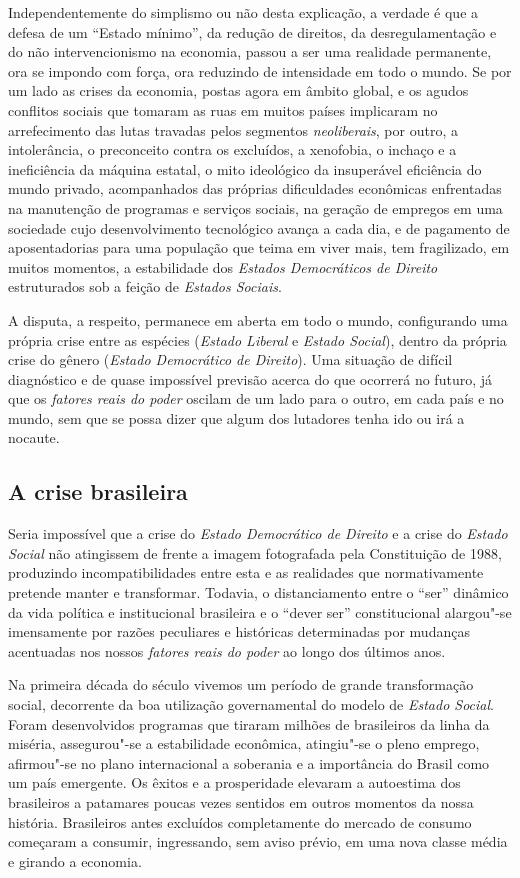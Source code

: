 Independentemente do simplismo ou não desta explicação, a verdade é que
a defesa de um ``Estado mínimo'', da redução de direitos, da
desregulamentação e do não intervencionismo na economia, passou a ser
uma realidade permanente, ora se impondo com força, ora reduzindo de
intensidade em todo o mundo. Se por um lado as crises da economia,
postas agora em âmbito global, e os agudos conflitos sociais que tomaram
as ruas em muitos países implicaram no arrefecimento das lutas travadas
pelos segmentos \emph{neoliberais}, por outro, a intolerância, o
preconceito contra os excluídos, a xenofobia, o inchaço e a ineficiência
da máquina estatal, o mito ideológico da insuperável eficiência do mundo
privado, acompanhados das próprias dificuldades econômicas enfrentadas
na manutenção de programas e serviços sociais, na geração de empregos em
uma sociedade cujo desenvolvimento tecnológico avança a cada dia, e de
pagamento de aposentadorias para uma população que teima em viver mais,
tem fragilizado, em muitos momentos, a estabilidade dos \emph{Estados
Democráticos de Direito} estruturados sob a feição de \emph{Estados
Sociais}.

A disputa, a respeito, permanece em aberta em todo o mundo, configurando
uma própria crise entre as espécies (\emph{Estado Liberal} e
\emph{Estado Social}), dentro da própria crise do gênero (\emph{Estado
Democrático de Direito}). Uma situação de difícil diagnóstico e de quase
impossível previsão acerca do que ocorrerá no futuro, já que os
\emph{fatores reais do poder} oscilam de um lado para o outro, em
cada país e no mundo, sem que se possa dizer que algum dos lutadores
tenha ido ou irá a nocaute.

\subsection{A crise brasileira}

Seria impossível que a crise do \emph{Estado Democrático de Direito} e a
crise do \emph{Estado Social} não atingissem de frente a imagem
fotografada pela Constituição de 1988, produzindo incompatibilidades
entre esta e as realidades que normativamente pretende manter e
transformar. Todavia, o distanciamento entre o ``ser'' dinâmico
da vida política e institucional brasileira e o ``dever ser''
constitucional alargou"-se imensamente por razões peculiares e históricas
determinadas por mudanças acentuadas nos nossos \emph{fatores reais do
poder} ao longo dos últimos anos.

Na primeira década do século  vivemos um período de grande
transformação social, decorrente da boa utilização governamental do
modelo de \emph{Estado Social}. Foram desenvolvidos programas que
tiraram milhões de brasileiros da linha da miséria, assegurou"-se a
estabilidade econômica, atingiu"-se o pleno emprego, afirmou"-se no plano
internacional a soberania e a importância do Brasil como um país
emergente. Os êxitos e a prosperidade elevaram a autoestima dos
brasileiros a patamares poucas vezes sentidos em outros momentos da
nossa história. Brasileiros antes excluídos completamente do mercado de
consumo começaram a consumir, ingressando, sem aviso prévio, em uma
nova classe média e girando a economia.

